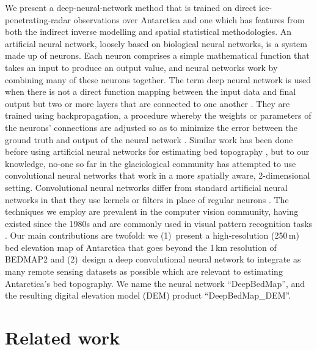 \documentclass[tc, noline]{copernicus}
\begin{document}
We present a deep-neural-network method that is trained on direct ice-penetrating-radar observations over Antarctica and one which has features from
both the indirect inverse modelling and spatial statistical methodologies. An artificial neural network, loosely based on biological neural networks,
is a system made up of neurons. Each neuron comprises a simple mathematical function that takes an input to produce an output value, and neural
networks work by combining many of these neurons together. The term deep neural network is used when there is not a direct function mapping between
the input data and final output but two or more layers that are connected to one another \citep[see][for a review]{LeCunDeeplearning2015}. They are
trained using backpropagation, a procedure whereby the weights or parameters of the neurons' connections are adjusted so as to minimize the error
between the ground truth and output of the neural network \citep{RumelhartLearningrepresentationsbackpropagating1986}. Similar work has been done
before using artificial neural networks for estimating bed topography
\citep[e.g.][]{ClarkeNeuralNetworksApplied2009,MonnierInferencebedtopography2018}, but to our knowledge, no-one so far in the glaciological community
has attempted to use convolutional neural networks that work in a more spatially aware, 2-dimensional setting. Convolutional neural networks differ
from standard artificial neural networks in that they use kernels or filters in place of regular neurons \citep[again, see][for a
review]{LeCunDeeplearning2015}. The techniques we employ are prevalent in the computer vision community, having existed since the 1980s
\citep{FukushimaNeocognitronnewalgorithm1982,LeCunBackpropagationAppliedHandwritten1989} and are commonly used in visual pattern recognition tasks
\citep[e.g.][]{LecunGradientbasedlearningapplied1998,KrizhevskyImageNetClassificationDeep2012}. Our main contributions are twofold: we (1)~present a high-resolution (250\,\unit{m}) bed elevation map of Antarctica that goes beyond the 1\,\unit{km} resolution of BEDMAP2
\citep{FretwellBedmap2improvedice2013} and (2)~design a deep convolutional neural network to integrate as many remote sensing datasets as possible
which are relevant to estimating Antarctica's bed topography. We name the neural network ``DeepBedMap'', and the resulting digital elevation model
(DEM) product ``DeepBedMap\_DEM''.


\section{Related work}
\end{document}

